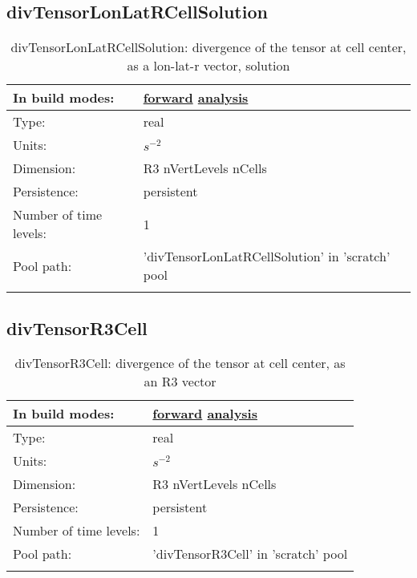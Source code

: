 \subsection[divTensorLonLatRCellSolution]{divTensorLonLatRCellSolution}
\label{subsec:var_sec_scratch_divTensorLonLatRCellSolution}
\begin{center}
\begin{longtable}{| p{2.0in} | p{4.0in} |}
        \hline 
        In build modes: & \hyperref[subsec:forward_var_tab_scratch]{forward} \hyperref[subsec:analysis_var_tab_scratch]{analysis} \\
        \hline 
        Type: & real \\
        \hline 
        Units: & $s^{-2}$ \\
        \hline 
        Dimension: & R3 nVertLevels nCells \\
        \hline 
        Persistence: & persistent \\
        \hline 
        Number of time levels: & 1 \\
        \hline 
            Pool path: & 'divTensorLonLatRCellSolution' in 'scratch' pool
 \\
		 \hline 
    \caption{divTensorLonLatRCellSolution: divergence of the tensor at cell center, as a lon-lat-r vector, solution}
\end{longtable}
\end{center}
\subsection[divTensorR3Cell]{divTensorR3Cell}
\label{subsec:var_sec_scratch_divTensorR3Cell}
\begin{center}
\begin{longtable}{| p{2.0in} | p{4.0in} |}
        \hline 
        In build modes: & \hyperref[subsec:forward_var_tab_scratch]{forward} \hyperref[subsec:analysis_var_tab_scratch]{analysis} \\
        \hline 
        Type: & real \\
        \hline 
        Units: & $s^{-2}$ \\
        \hline 
        Dimension: & R3 nVertLevels nCells \\
        \hline 
        Persistence: & persistent \\
        \hline 
        Number of time levels: & 1 \\
        \hline 
            Pool path: & 'divTensorR3Cell' in 'scratch' pool
 \\
		 \hline 
    \caption{divTensorR3Cell: divergence of the tensor at cell center, as an R3 vector}
\end{longtable}
\end{center}
